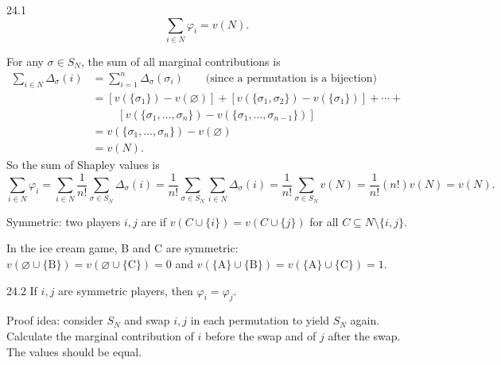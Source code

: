\documentclass[12pt,letterpaper]{report}
\begin{document}
\begin{prop}{}{24.1}
  \[
    \sum_{i \in N} \varphi_i = v(N).
  \]
\end{prop}

\begin{thmproof}
  For any $\sigma \in S_N$, the sum of all marginal contributions is
  \begin{align*}
    \sum_{i \in N} \Delta_\sigma(i)
    &= \sum_{i = 1}^n \Delta_\sigma(\sigma_i) \qquad \text{(since a permutation is a bijection)} \\
    &= \left[ v(\{\sigma_1\}) - v(\varnothing) \right]
     + \left[ v(\{\sigma_1, \sigma_2\}) - v(\{\sigma_1\}) \right]
     + \cdots + \\
    &\phantom{={}} \quad\left[ v(\{\sigma_1, \ldots, \sigma_n\}) -
      v(\{\sigma_1, \ldots, \sigma_{n - 1}\}) \right] \\
    &= v(\{\sigma_1, \ldots, \sigma_n\}) - v(\varnothing) \\
    &= v(N).
  \end{align*}
  So the sum of Shapley values is
  \[
    \sum_{i \in N} \varphi_i
      = \sum_{i \in N} \frac{1}{n!} \sum_{\sigma \in S_N} \Delta_\sigma(i)
      = \frac{1}{n!} \sum_{\sigma \in S_N} \sum_{i \in N} \Delta_\sigma(i)
      = \frac{1}{n!} \sum_{\sigma \in S_N} v(N)
      = \frac{1}{n!} (n!) v(N)
      = v(N).
  \]
\end{thmproof}

\begin{enumcase}[start=2]
  \item
  Symmetric: two players $i, j$ are  if $v(C \cup \{i\}) = v(C \cup \{j\})$ for all
  $C \subseteq N \setminus \{i, j\}$.
\end{enumcase}

\begin{ex}
  In the ice cream game, B and C are symmetric:
  $v(\varnothing \cup \{\text{B}\}) = v(\varnothing \cup \{\text{C}\}) = 0$ and
  $v(\{\text{A}\} \cup \{\text{B}\}) = v(\{\text{A}\} \cup \{\text{C}\}) = 1$.
\end{ex}

\begin{prop}{}{24.2}
  If $i, j$ are symmetric players, then $\varphi_i = \varphi_j$.
\end{prop}

Proof idea: consider $S_N$ and swap $i, j$ in each permutation to yield $S_N$ again.
Calculate the marginal contribution of $i$ before the swap and of $j$ after the swap.
The values should be equal.
\end{document}
